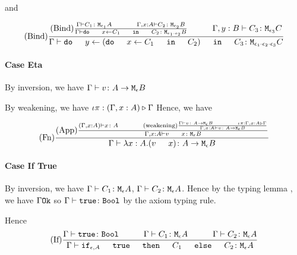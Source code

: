 {        and 

        \begin{equation}
            \treerule{Bind}{
                \treerule{Bind}{
                    \gtyperelation{C_1}{\M{\e_1}{A}}
                    \s\s
                    \typerelation{\gax}{C_2}{\M{\e_2}{B}}
                } {
                    \gtyperelation{\doin{x}{C_1}{C_2}}{\M{\e_1\dot\e_2}{B}}
                }
                \s\s
                \typerelation{\gby}{C_3}{\M{\e_3}{C}}
            }{
                \gtyperelation{\doin{y}{(\doin{x}{C_1}{C_2})}{C_3}}{\M{\e_1\dot\e_2\dot\e_3}{C}}
            }
        \end{equation}

        \paragraph{Case Eta}
        By inversion, we have $\Gamma \vdash v \colon A \rightarrow \texttt{M}_{\epsilon}{B}$

        By weakening, we have $\iota\pi : (\Gamma, x: A) \triangleright \Gamma$
        Hence, we have

        \begin{equation}
            \treerule{Fn}{
                \treerule{App}{
                    \typerelation{(\gax)}{x}{A}
                    \s\s
                    \treerule{weakening}{
                        \gtyperelation{v}{\aeb}
                        \s\s
                        \wrel{\i\pi}{\gax}{\G}
                    }{
                        \typerelation{\gax}{v}{\aeb}
                    }
                } {
                    \typerelation{\gax}{\apply{v}{x}}{\meb}
                }
            }{\gtyperelation{\lam{x}{A}{(\apply{v}{x})}}{\aeb}}
        \end{equation}

        \paragraph{Case If True}
            By inversion, we have $\Gamma \vdash C_1 \colon \texttt{M}_{\epsilon}{A}$, $\Gamma \vdash C_2 \colon \texttt{M}_{\epsilon}{A}$. Hence by the typing lemma , we have $\Gamma \texttt{Ok}$ so $\Gamma \vdash \texttt{true} \colon \texttt{Bool}$ by the axiom typing rule.

            Hence 
            \begin{equation}
                    \treerule{If}{
                        \gtyperelation{\t}{\B}
                        \s\s
                        \gtyperelation{C_1}{\mea}
                        \s\s
                        \gtyperelation{C_2}{\mea}
                    }{
                        \gtyperelation{\ifthenelse{\e}{A}{\t}{C_1}{C_2}}{\mea}
                    }
            \end{equation}
}
